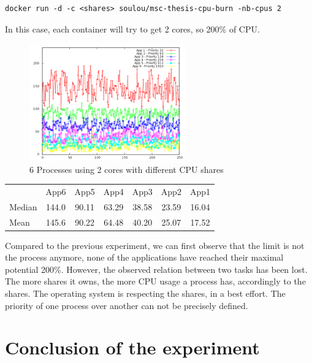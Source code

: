\begin{lstlisting}
docker run -d -c <shares> soulou/msc-thesis-cpu-burn -nb-cpus 2
\end{lstlisting}

In this case, each container will try to get 2 cores, so 200\% of CPU.

\begin{figure}[h1]
\begin{center}
	\includegraphics[width=0.6\textwidth]{./Images/CpuMonitor/vm/6_differentshares_2cores.png}
	\caption{6 Processes using 2 cores with different CPU shares}
\end{center}
\end{figure}

\vspace{2em}

\begin{center}
\begin{tabular}{l | c | c | c | c | c | c}
		& App6 & App5 & App4 & App3 & App2 & App1 \\
	Median  & 144.0 & 90.11 & 63.29 & 38.58 & 23.59 & 16.04 \\
	Mean    & 145.6 & 90.22 & 64.48 & 40.20 & 25.07 & 17.52
\end{tabular}
\end{center}

Compared to the previous experiment, we can first observe that the limit is not
the process anymore, none of the applications have reached their maximal
potential 200\%. However, the observed relation between two tasks has been
lost. The more shares it owns, the more CPU usage a process has, accordingly to
the shares. The operating system is respecting the shares, in a best effort.
The priority of one process over another can not be precisely defined.

\section{Conclusion of the experiment}

